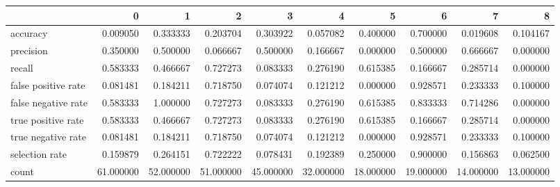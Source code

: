\begin{tabular}{lrrrrrrrrr}
\toprule
{} &          0 &          1 &          2 &          3 &          4 &          5 &          6 &          7 &          8 \\
\midrule
accuracy            &   0.009050 &   0.333333 &   0.203704 &   0.303922 &   0.057082 &   0.400000 &   0.700000 &   0.019608 &   0.104167 \\
precision           &   0.350000 &   0.500000 &   0.066667 &   0.500000 &   0.166667 &   0.000000 &   0.500000 &   0.666667 &   0.000000 \\
recall              &   0.583333 &   0.466667 &   0.727273 &   0.083333 &   0.276190 &   0.615385 &   0.166667 &   0.285714 &   0.000000 \\
false positive rate &   0.081481 &   0.184211 &   0.718750 &   0.074074 &   0.121212 &   0.000000 &   0.928571 &   0.233333 &   0.100000 \\
false negative rate &   0.583333 &   1.000000 &   0.727273 &   0.083333 &   0.276190 &   0.615385 &   0.833333 &   0.714286 &   0.000000 \\
true positive rate  &   0.583333 &   0.466667 &   0.727273 &   0.083333 &   0.276190 &   0.615385 &   0.166667 &   0.285714 &   0.000000 \\
true negative rate  &   0.081481 &   0.184211 &   0.718750 &   0.074074 &   0.121212 &   0.000000 &   0.928571 &   0.233333 &   0.100000 \\
selection rate      &   0.159879 &   0.264151 &   0.722222 &   0.078431 &   0.192389 &   0.250000 &   0.900000 &   0.156863 &   0.062500 \\
count               &  61.000000 &  52.000000 &  51.000000 &  45.000000 &  32.000000 &  18.000000 &  19.000000 &  14.000000 &  13.000000 \\
\bottomrule
\end{tabular}
